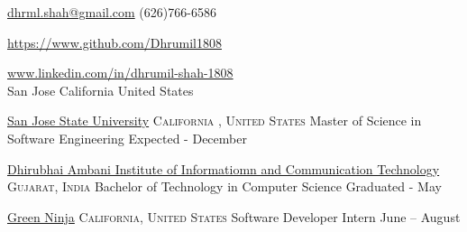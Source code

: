 \documentclass[10pt,a4paper]{article}
\begin{document}
\sloppy  %



\nobreakvspace{0.4em}

\noindent\href{mailto:dhrml.shah.at.gmail.dot.com}{dhrml.shah\mbox{}@\mbox{}gmail.com}\sbull
\textsmaller (626)766-6586\sbull
{\newnums \href{https://github.com/Dhrumil1808}{https://www.github.com/Dhrumil1808}\sbull
{\mewmums \href{https://www.linkedin.com/in/dhrumil-shah-1808/}{www.linkedin.com/in/dhrumil-shah-1808}
\\
{San Jose\sbull
California\sbull
United States
}


\headedsection
  {\href{http://www.sjsu.edu/}{San Jose State University} }
  {\textsc {California , United States}} {%
  \headedsubsection
    {Master of Science in Software Engineering}
    {Expected - December }
    {}
}


\headedsection
  {\href{http://daiict.ac.in}{Dhirubhai Ambani Institute of Informatiomn and Communication Technology} }
  {\textsc{Gujarat, India}} {%
  \headedsubsection
    {Bachelor of Technology in Computer Science }
    {Graduated - May }
    {}
}

\spacedhrule{0.0em}{-0.4em}





\headedsection  %
  {\href{http://www.greenninja.org/}{Green Ninja}}
  {\textsc{California, United States}} {%
  \headedsubsection
    {Software Developer Intern}
    {June  -- August }{
    }}}}
\end{document}
